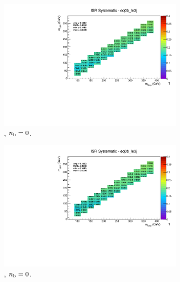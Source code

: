 \begin{figure}[ht!]
  \centering
  \begin{subfigure}[b]{0.32\textwidth}
    \includegraphics[width=\textwidth, page=14]{Figs/sms/t2degen/v19_3/systs/T2_4body_ISR_eq0b_le3j.pdf}
    \caption{\njlow, $n_{\text{b}} = 0$.}
  \end{subfigure}
  \begin{subfigure}[b]{0.32\textwidth}
    \includegraphics[width=\textwidth, page=9]{Figs/sms/t2degen/v19_3/systs/T2_4body_ISR_eq0b_le3j.pdf}
    \caption{\njlow, $n_{\text{b}} = 0$.}
  \end{subfigure}
  \begin{subfigure}[b]{0.32\textwidth}

\end{subfigure}
\end{figure}
